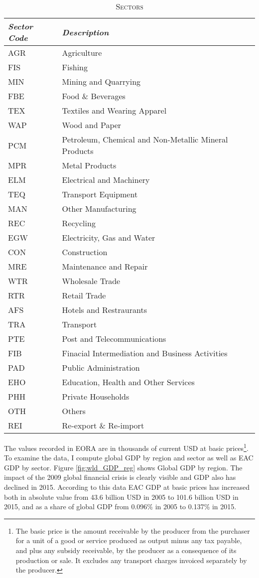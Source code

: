 \documentclass[a4paper]{article}
\begin{document}
\begin{table}[h!]
\centering
\caption{\textsc{Sectors}}

\label{tab:sec}
\vspace{2mm}
\begin{tabular}{ll} \toprule
\textit{Sector Code} & \textit{Description} \\ \midrule
AGR & Agriculture \\
 FIS & Fishing \\
 MIN & Mining and Quarrying \\
 FBE & Food \& Beverages \\
 TEX & Textiles and Wearing Apparel \\
 WAP & Wood and Paper \\
 PCM & Petroleum, Chemical and Non-Metallic Mineral Products \\
 MPR & Metal Products \\
 ELM & Electrical and Machinery \\
 TEQ & Transport Equipment \\
 MAN & Other Manufacturing \\
 REC & Recycling \\
 EGW & Electricity, Gas and Water \\
 CON & Construction \\
 MRE & Maintenance and Repair \\
 WTR & Wholesale Trade \\
 RTR & Retail Trade \\
 AFS & Hotels and Restraurants \\
 TRA & Transport \\
 PTE & Post and Telecommunications \\
 FIB & Finacial Intermediation and Business Activities \\
 PAD & Public Administration \\
 EHO & Education, Health and Other Services \\
 PHH & Private Households \\
 OTH & Others \\
 REI & Re-export \& Re-import \\ \bottomrule
\end{tabular}
\end{table}
\FloatBarrier


The values recorded in EORA are in thousands of current USD at basic prices\footnote{The basic price is the amount receivable by the producer from the purchaser for a unit of a good or service produced as output minus any tax payable, and plus any subsidy receivable, by the producer as a consequence of its production or sale. It excludes any transport charges invoiced separately by the producer.}. To examine the data, I compute global GDP by region and sector as well as EAC GDP by sector. Figure \ref{fig:wld_GDP_reg} shows Global GDP by region. The impact of the 2009 global financial crisis is clearly visible and GDP also has declined in 2015. %
According to this data EAC GDP at basic prices has increased both in absolute value from 43.6 billion USD in 2005 to 101.6 billion USD in 2015, and as a share of global GDP from 0.096\% in 2005 to 0.137\% in 2015. \newline
\end{document}
